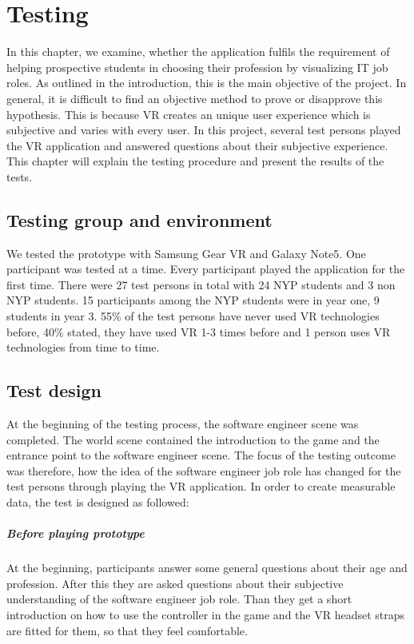 \chapter{Testing}\label{testing}
In this chapter, we examine, whether the application fulfils the requirement of helping prospective students in choosing their profession by visualizing IT job roles. As outlined in the introduction, this is the main objective of the project. In general, it is difficult to find an objective method to prove or disapprove this hypothesis. This is because VR creates an unique user experience which is subjective and varies with every user. In this project, several test persons played the VR application and answered questions about their subjective experience. This chapter will explain the testing procedure and present the results of the tests.

\section{Testing group and environment}
We tested the prototype with Samsung Gear VR and Galaxy Note5. One participant was tested at a time. Every participant played the application for the first time. There were 27 test persons in total with 24 NYP students and 3 non NYP students. 15 participants among the NYP students were in year one, 9 students in year 3. 55\% of the test persons have never used VR technologies before, 40\% stated, they have used VR 1-3 times before and 1 person uses VR technologies from time to time.
\section{Test design}
At the beginning of the testing process, the software engineer scene was completed. The world scene contained the introduction to the game and the entrance point to the software engineer scene. The focus of the testing outcome was therefore, how the idea of the software engineer job role has changed for the test persons through playing the VR application. In order to create measurable data, the test is designed as followed:

\paragraph{Before playing prototype} At the beginning, participants answer some general questions about their age and profession. After this they are asked questions about their subjective understanding of the software engineer job role. Than they get a short introduction on how to use the controller in the game and the VR headset straps are fitted for them, so that they feel comfortable. 
